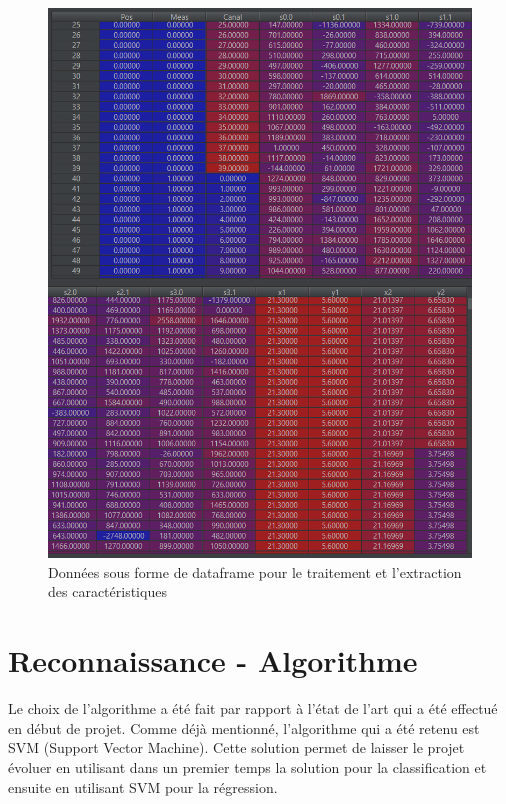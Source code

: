 \begin{figure}[H]
 \begin{center}
  \includegraphics[scale=0.6]{figures/dataframe2.png}
  \caption{Données sous forme de dataframe pour le traitement et l'extraction des caractéristiques}
  \label{fig:dataframe} %
 \end{center}
\end{figure}

\section{Reconnaissance - Algorithme}
Le choix de l'algorithme a été fait par rapport à l'état de l'art qui a été effectué en début de projet. Comme déjà mentionné, l'algorithme qui a été retenu est SVM (Support Vector Machine). Cette solution permet de laisser le projet évoluer en utilisant dans un premier temps la solution pour la classification et ensuite en utilisant SVM pour la régression. 

